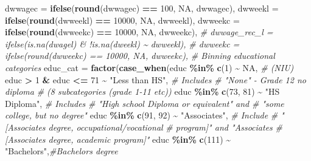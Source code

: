 \documentclass[
]{article}
\newenvironment{Shaded}{\begin{snugshade}}{\end{snugshade}}
\newcommand{\AttributeTok}[1]{\textcolor[rgb]{0.13,0.29,0.53}{#1}}
\newcommand{\CommentTok}[1]{\textcolor[rgb]{0.56,0.35,0.01}{\textit{#1}}}
\newcommand{\ConstantTok}[1]{\textcolor[rgb]{0.56,0.35,0.01}{#1}}
\newcommand{\DecValTok}[1]{\textcolor[rgb]{0.00,0.00,0.81}{#1}}
\newcommand{\FunctionTok}[1]{\textcolor[rgb]{0.13,0.29,0.53}{\textbf{#1}}}
\newcommand{\NormalTok}[1]{#1}
\newcommand{\SpecialCharTok}[1]{\textcolor[rgb]{0.81,0.36,0.00}{\textbf{#1}}}
\newcommand{\StringTok}[1]{\textcolor[rgb]{0.31,0.60,0.02}{#1}}
\begin{document}
\begin{Shaded}
\begin{Highlighting}[]
         \AttributeTok{dwwagec =} \FunctionTok{ifelse}\NormalTok{(}\FunctionTok{round}\NormalTok{(dwwagec) }\SpecialCharTok{==} \DecValTok{100}\NormalTok{, }\ConstantTok{NA}\NormalTok{, dwwagec),}
         \AttributeTok{dwweekl =} \FunctionTok{ifelse}\NormalTok{(}\FunctionTok{round}\NormalTok{(dwweekl) }\SpecialCharTok{==} \DecValTok{10000}\NormalTok{, }\ConstantTok{NA}\NormalTok{, dwweekl),}
         \AttributeTok{dwweekc =} \FunctionTok{ifelse}\NormalTok{(}\FunctionTok{round}\NormalTok{(dwweekc) }\SpecialCharTok{==} \DecValTok{10000}\NormalTok{, }\ConstantTok{NA}\NormalTok{, dwweekc),}
         \CommentTok{\# dwwage\_rec\_l = ifelse(is.na(dwagel) \& !is.na(dweekl) \textasciitilde{} dwweekl),}
         \CommentTok{\# dwweekc = ifelse(round(dwweekc) == 10000, NA, dwweekc),}
         \CommentTok{\# Binning educational categories}
         \AttributeTok{educ\_cat =} \FunctionTok{factor}\NormalTok{(}\FunctionTok{case\_when}\NormalTok{(educ }\SpecialCharTok{\%in\%} \FunctionTok{c}\NormalTok{(}\DecValTok{1}\NormalTok{) }\SpecialCharTok{\textasciitilde{}} \ConstantTok{NA}\NormalTok{, }\CommentTok{\# (NIU)}
\NormalTok{                              educ }\SpecialCharTok{\textgreater{}} \DecValTok{1} \SpecialCharTok{\&}\NormalTok{ educ }\SpecialCharTok{\textless{}=} \DecValTok{71} \SpecialCharTok{\textasciitilde{}} \StringTok{"Less than HS"}\NormalTok{, }\CommentTok{\# Includes }
                                  \CommentTok{\# "None" {-} Grade 12 no diploma }
                                  \CommentTok{\# (8 subcategories (grade 1{-}11 etc))}
\NormalTok{                              educ }\SpecialCharTok{\%in\%} \FunctionTok{c}\NormalTok{(}\DecValTok{73}\NormalTok{, }\DecValTok{81}\NormalTok{) }\SpecialCharTok{\textasciitilde{}} \StringTok{"HS Diploma"}\NormalTok{, }\CommentTok{\# Includes }
                                  \CommentTok{\# "High school Diploma or equivalent" and }
                                  \CommentTok{\# "some college, but no degree"}
\NormalTok{                              educ }\SpecialCharTok{\%in\%} \FunctionTok{c}\NormalTok{(}\DecValTok{91}\NormalTok{, }\DecValTok{92}\NormalTok{) }\SpecialCharTok{\textasciitilde{}} \StringTok{"Associate\textquotesingle{}s"}\NormalTok{, }\CommentTok{\# Include }
                                  \CommentTok{\# "[Associate\textquotesingle{}s degree, occupational/vocational }
                                  \CommentTok{\# program]" and "Associate\textquotesingle{}s }
                                  \CommentTok{\# [Associate\textquotesingle{}s degree, academic program]"}
\NormalTok{                              educ }\SpecialCharTok{\%in\%} \FunctionTok{c}\NormalTok{(}\DecValTok{111}\NormalTok{) }\SpecialCharTok{\textasciitilde{}} \StringTok{"Bachelor\textquotesingle{}s"}\NormalTok{,}\CommentTok{\#Bachelor\textquotesingle{}s degree}

\end{Highlighting}
\end{Shaded}
\end{document}
